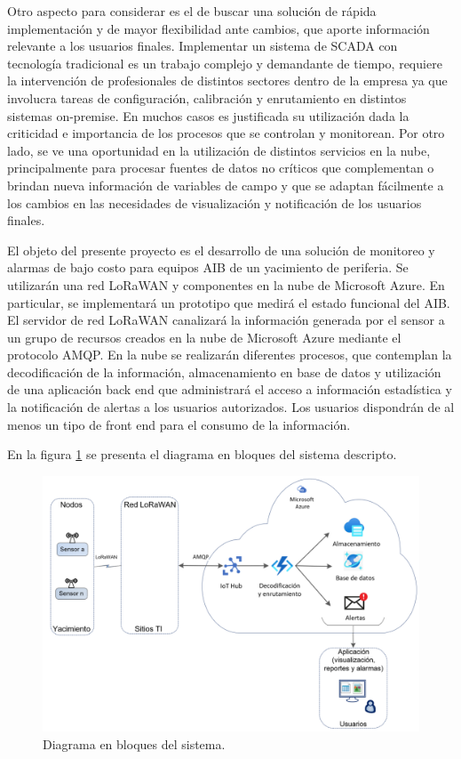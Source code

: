 \documentclass[
11pt, %
]{charter}
\begin{document}
Otro aspecto para considerar es el de buscar una solución de rápida implementación y de mayor flexibilidad ante cambios, que aporte información relevante a los usuarios finales. Implementar un sistema de SCADA con tecnología tradicional es un trabajo complejo y demandante de tiempo, requiere la intervención de profesionales de distintos sectores dentro de la empresa ya que involucra tareas de configuración, calibración y enrutamiento en distintos sistemas on-premise. En muchos casos es justificada su utilización dada la criticidad e importancia de los procesos que se controlan y monitorean. Por otro lado, se ve una oportunidad en la utilización de distintos servicios en la nube, principalmente para procesar fuentes de datos no críticos que complementan o brindan nueva información de variables de campo y que se adaptan fácilmente a los cambios en las necesidades de visualización y notificación de los usuarios finales.

El objeto del presente proyecto es el desarrollo de una solución de monitoreo y alarmas de bajo costo para equipos AIB de un yacimiento de periferia. Se utilizarán una red LoRaWAN y componentes en la nube de Microsoft Azure.
En particular, se implementará un prototipo que medirá el estado funcional del AIB. El servidor de red LoRaWAN canalizará la información generada por el sensor a un grupo de recursos creados en la nube de Microsoft Azure mediante el protocolo AMQP.
En la nube se realizarán diferentes procesos, que contemplan la decodificación de la información, almacenamiento en base de datos y utilización de una aplicación back end que administrará el acceso a información estadística y la notificación de alertas a los usuarios autorizados.
Los usuarios dispondrán de al menos un tipo de front end para el consumo de la información.

En la figura \ref{fig:diagBloques} se presenta el diagrama en bloques del sistema descripto.


\begin{figure}[htpb]
\centering 
\includegraphics[width=.8\textwidth]{./Figuras/diagrama_bloques_conceptual2.png}
\caption{Diagrama en bloques del sistema.}
\label{fig:diagBloques}
\end{figure}
\end{document}
